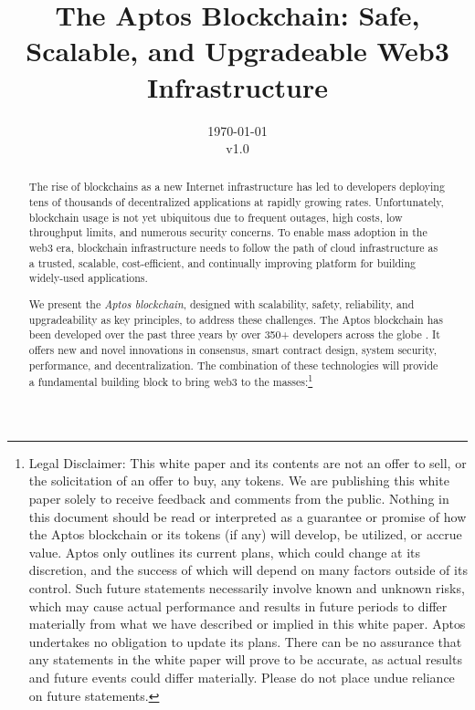 \documentclass{article}
\title{The Aptos Blockchain: Safe, Scalable, and Upgradeable Web3 Infrastructure}
\author{}
\date{\today\\v1.0}
\begin{document}
\maketitle

\begin{abstract}
The rise of blockchains as a new Internet infrastructure has led to developers deploying tens of thousands of decentralized applications at rapidly growing rates. Unfortunately, blockchain usage is not yet ubiquitous due to frequent outages, high costs, low throughput limits, and numerous security concerns. To enable mass adoption in the web3 era, blockchain infrastructure needs to follow the path of cloud infrastructure as a trusted, scalable, cost-efficient, and continually improving platform for building widely-used applications. 
 
We present the \emph{Aptos blockchain}, designed with scalability, safety, reliability, and upgradeability as key principles, to address these challenges. The Aptos blockchain has been developed over the past three years by over 350+ developers across the globe \cite{aptos_core_github}. It offers new and novel innovations in consensus, smart contract design, system security, performance, and decentralization. The combination of these technologies will provide a fundamental building block to bring web3 to the masses:\footnote{Legal Disclaimer: This white paper and its contents are not an offer to sell, or the solicitation of an offer to buy, any tokens. We are publishing this white paper solely to receive feedback and comments from the public. Nothing in this document should be read or interpreted as a guarantee or promise of how the Aptos blockchain or its tokens (if any) will develop, be utilized, or accrue value. Aptos only outlines its current plans, which could change at its discretion, and the success of which will depend on many factors outside of its control. Such future statements necessarily involve known and unknown risks, which may cause actual performance and results in future periods to differ materially from what we have described or implied in this white paper. Aptos undertakes no obligation to update its plans. There can be no assurance that any statements in the white paper will prove to be accurate, as actual results and future events could differ materially. Please do not place undue reliance on future statements.}
 

\end{abstract}
\end{document}
